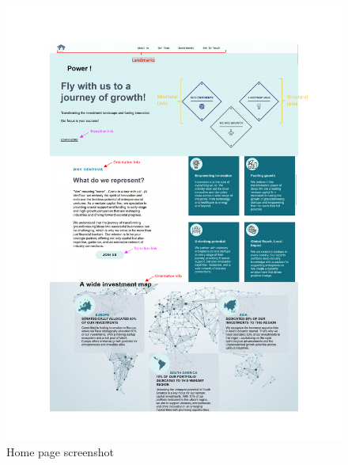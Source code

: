 \documentclass[../../DD.tex]{subfiles}
\begin{document}
    \begin{figure}[!htb]
        \centering
        \includegraphics[width=\textwidth, page=2, trim=0 250 0 0, clip]{Images/screenshots/Home Page.pdf}
        \caption{Home page screenshot}
        \label{fig: Home_Page_screenshot2}
    \end{figure}
\end{document}
